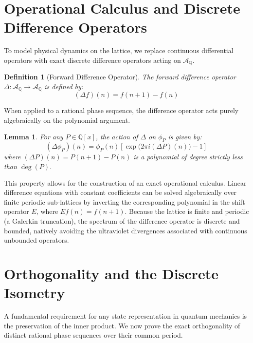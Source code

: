 \documentclass[11pt,a4paper]{article}
\newtheorem{lemma}[theorem]{Lemma}
\newtheorem{definition}[theorem]{Definition}
\begin{document}
\section{Operational Calculus and Discrete Difference Operators}

To model physical dynamics on the lattice, we replace continuous differential operators with exact discrete difference operators acting on $\mathcal{A}_{\mathbb{Q}}$.

\begin{definition}[Forward Difference Operator]
The forward difference operator $\Delta : \mathcal{A}_{\mathbb{Q}} \to \mathcal{A}_{\mathbb{Q}}$ is defined by:
\begin{equation}
(\Delta f)(n) = f(n+1) - f(n)
\end{equation}
\end{definition}

When applied to a rational phase sequence, the difference operator acts purely algebraically on the polynomial argument.
\begin{lemma}
For any $P \in \mathbb{Q}[x]$, the action of $\Delta$ on $\phi_P$ is given by:
\begin{equation}
(\Delta \phi_P)(n) = \phi_P(n) \left[ \exp\big(2\pi i (\Delta P)(n)\big) - 1 \right]
\end{equation}
where $(\Delta P)(n) = P(n+1) - P(n)$ is a polynomial of degree strictly less than $\deg(P)$.
\end{lemma}

This property allows for the construction of an exact operational calculus. Linear difference equations with constant coefficients can be solved algebraically over finite periodic sub-lattices by inverting the corresponding polynomial in the shift operator $E$, where $Ef(n) = f(n+1)$. Because the lattice is finite and periodic (a Galerkin truncation), the spectrum of the difference operator is discrete and bounded, natively avoiding the ultraviolet divergences associated with continuous unbounded operators.

\section{Orthogonality and the Discrete Isometry}

A fundamental requirement for any state representation in quantum mechanics is the preservation of the inner product. We now prove the exact orthogonality of distinct rational phase sequences over their common period.
\end{document}
